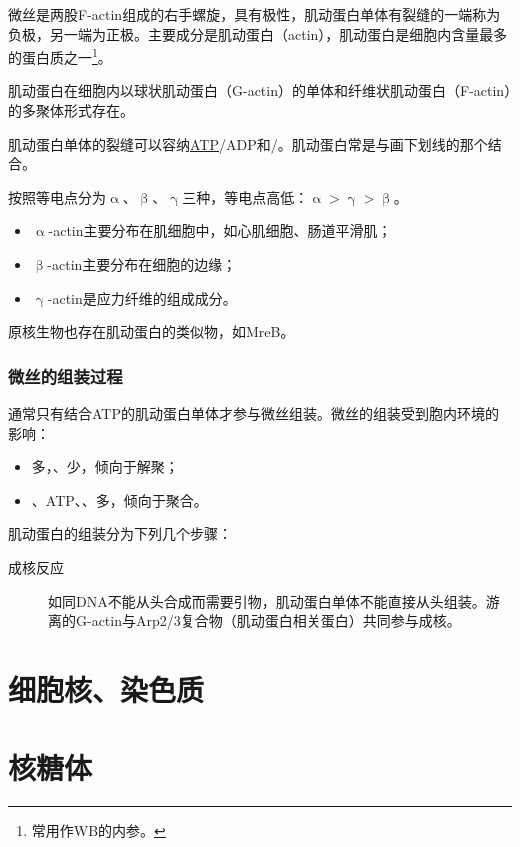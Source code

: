 微丝是两股F-actin组成的右手螺旋，具有极性，肌动蛋白单体有裂缝的一端称为负极，另一端为正极。主要成分是肌动蛋白（actin），肌动蛋白是细胞内含量最多的蛋白质之一\footnote{常用作WB的内参。}。

肌动蛋白在细胞内以球状肌动蛋白（G-actin）的单体和纤维状肌动蛋白（F-actin）的多聚体形式存在。

肌动蛋白单体的裂缝可以容纳\underline{ATP}/ADP和/\underline{}。肌动蛋白常是与画下划线的那个结合。

按照等电点分为$\upalpha$、$\upbeta$、$\upgamma$三种，等电点高低：$\upalpha>\upgamma>\upbeta$。

\begin{itemize}
	\item $\upalpha$-actin主要分布在肌细胞中，如心肌细胞、肠道平滑肌；
	\item $\upbeta$-actin主要分布在细胞的边缘；
	\item $\upgamma$-actin是应力纤维的组成成分。
\end{itemize}

原核生物也存在肌动蛋白的类似物，如MreB。



\subsubsection{微丝的组装过程}

通常只有结合ATP的肌动蛋白单体才参与微丝组装。微丝的组装受到胞内环境的影响：

\begin{itemize}
	\item {}多，、少，倾向于解聚；
	\item {}、ATP、、多，倾向于聚合。
\end{itemize}

肌动蛋白的组装分为下列几个步骤：

\begin{description}
	\item[成核反应] 如同DNA不能从头合成而需要引物，肌动蛋白单体不能直接从头组装。游离的G-actin与Arp2/3复合物（肌动蛋白相关蛋白）共同参与成核。
\end{description}
\section{细胞核、染色质}

\section{核糖体}

